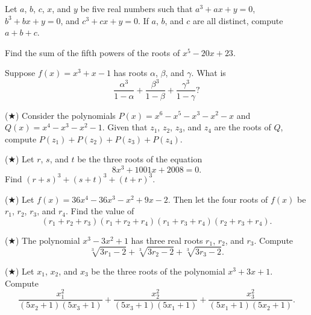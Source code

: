 \documentclass[11pt]{scrartcl}
\begin{document}
\begin{exercise}
	Let $a$, $b$, $c$, $x$, and $y$ be five real numbers such that $a^3 + ax + y = 0$, $b^3 + bx + y = 0$, and $c^3 + cx + y = 0$. If $a$, $b$, and $c$ are all distinct, compute $a + b + c$.
\end{exercise}

\begin{exercise}
	Find the sum of the fifth powers of the roots of $x^5 - 20x + 23$.
\end{exercise}

\begin{exercise}[CHMMC]
    Suppose $f(x) = x^3 + x - 1$ has roots $\alpha$, $\beta$, and $\gamma$. What is
    \[\frac{\alpha^3}{1 - \alpha} + \frac{\beta^3}{1 - \beta} + \frac{\gamma^3}{1 - \gamma}\text{?}\]
\end{exercise}

\begin{exercise}[AIME II 2003/9] ($\bigstar$)
    Consider the polynomials $P(x) = x^{6} - x^{5} - x^{3} - x^{2} - x$ and $Q(x) = x^4 - x^3 - x^2 - 1$. Given that $z_1$, $z_2$, $z_3$, and $z_4$ are the roots of $Q$, compute $P(z_1) + P(z_2) + P(z_3) + P(z_4)$.
\end{exercise}

\begin{exercise}[AIME II 2008/7] ($\bigstar$)
    Let $r$, $s$, and $t$ be the three roots of the equation
    \[8x^3 + 1001x + 2008 = 0.\]
    Find $(r + s)^3 + (s + t)^3 + (t + r)^3$.
\end{exercise}

\begin{exercise}[SMT 2019/A5] ($\bigstar$)
    Let $f(x) = 36x^4 - 36x^3 - x^2 + 9x - 2$. Then let the four roots of $f(x)$ be $r_1$, $r_2$, $r_3$, and $r_4$. Find the value of
    \[(r_1 + r_2 + r_3)(r_1 + r_2 + r_4)(r_1 + r_3 + r_4)(r_2 + r_3 + r_4).\]
\end{exercise}

\begin{exercise} ($\bigstar$)
    The polynomial $x^3 - 3x^2 + 1$ has three real roots $r_1$, $r_2$, and $r_3$. Compute
    \[\sqrt[3]{3r_1 - 2} + \sqrt[3]{3r_2 - 2} + \sqrt[3]{3r_3 - 2}.\]
\end{exercise}

\begin{exercise} ($\bigstar$)
	Let $x_1$, $x_2$, and $x_3$ be the three roots of the polynomial $x^3 + 3x + 1$. Compute
	\[\frac{x_1^2}{(5x_2 + 1)(5x_3 + 1)} + \frac{x_2^2}{(5x_3 + 1)(5x_1 + 1)} + \frac{x_3^2}{(5x_1 + 1)(5x_2 + 1)}.\]
\end{exercise}
\end{document}
